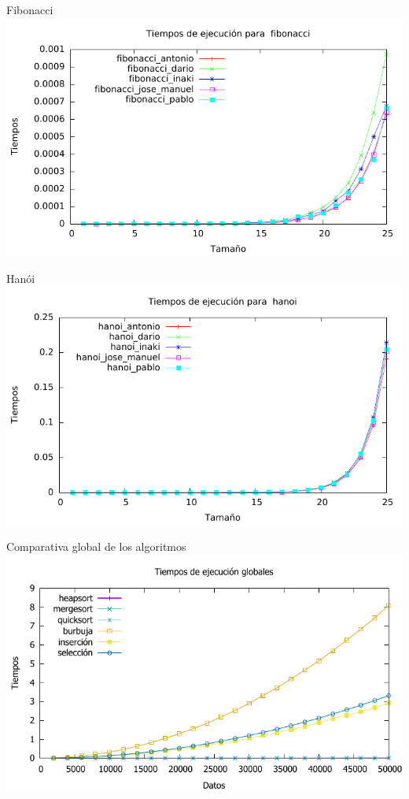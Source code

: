 \documentclass[10pt,compress,usetitleprogressbar,mathserif]{beamer}
\begin{document}
\begin{frame}{Fibonacci}
		\includegraphics[width = \textwidth ]{fibonacci_todos_g}
\end{frame}

\begin{frame}{Hanói}
		\includegraphics[width = \textwidth ]{hanoi_todos_g}
\end{frame}

\begin{frame}{Comparativa global de los algoritmos}
		\includegraphics[width = \textwidth ]{comparativa_global_g}
\end{frame}
\end{document}
